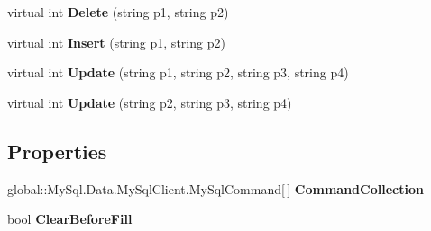 \begin{DoxyCompactItemize}
\item 
virtual int {\bfseries Delete} (string p1, string p2)\hypertarget{class_products_1_1_data_1_1ds_sage_table_adapters_1_1ta_maschinentyp_a0512438d2dbe465d26527fe823b57e15}{}\label{class_products_1_1_data_1_1ds_sage_table_adapters_1_1ta_maschinentyp_a0512438d2dbe465d26527fe823b57e15}

\item 
virtual int {\bfseries Insert} (string p1, string p2)\hypertarget{class_products_1_1_data_1_1ds_sage_table_adapters_1_1ta_maschinentyp_af52e4bcba8599051be84da876d95d3e0}{}\label{class_products_1_1_data_1_1ds_sage_table_adapters_1_1ta_maschinentyp_af52e4bcba8599051be84da876d95d3e0}

\item 
virtual int {\bfseries Update} (string p1, string p2, string p3, string p4)\hypertarget{class_products_1_1_data_1_1ds_sage_table_adapters_1_1ta_maschinentyp_af5022889b3a6aa40789132b84cb32fca}{}\label{class_products_1_1_data_1_1ds_sage_table_adapters_1_1ta_maschinentyp_af5022889b3a6aa40789132b84cb32fca}

\item 
virtual int {\bfseries Update} (string p2, string p3, string p4)\hypertarget{class_products_1_1_data_1_1ds_sage_table_adapters_1_1ta_maschinentyp_a55966845fad99ae7c1224ff55c199768}{}\label{class_products_1_1_data_1_1ds_sage_table_adapters_1_1ta_maschinentyp_a55966845fad99ae7c1224ff55c199768}

\end{DoxyCompactItemize}
\subsection*{Properties}
\begin{DoxyCompactItemize}
\item 
global\+::\+My\+Sql.\+Data.\+My\+Sql\+Client.\+My\+Sql\+Command\mbox{[}$\,$\mbox{]} {\bfseries Command\+Collection}\hypertarget{class_products_1_1_data_1_1ds_sage_table_adapters_1_1ta_maschinentyp_a1074c9b7481e158a48bc3630600fe54e}{}\label{class_products_1_1_data_1_1ds_sage_table_adapters_1_1ta_maschinentyp_a1074c9b7481e158a48bc3630600fe54e}

\item 
bool {\bfseries Clear\+Before\+Fill}\hypertarget{class_products_1_1_data_1_1ds_sage_table_adapters_1_1ta_maschinentyp_aa06fd595092c22fe8d894183270f23b4}{}\label{class_products_1_1_data_1_1ds_sage_table_adapters_1_1ta_maschinentyp_aa06fd595092c22fe8d894183270f23b4}

\end{DoxyCompactItemize}


